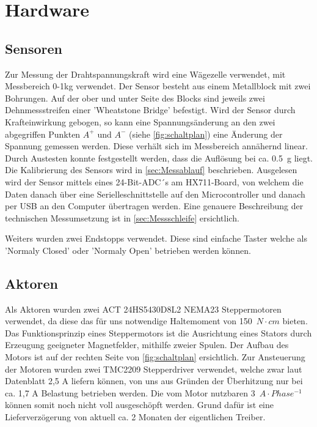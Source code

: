 \section{Hardware}
\label{sec:Hardware}

\subsection{Sensoren}

Zur Messung der Drahtspannungskraft wird eine Wägezelle verwendet, mit Messbereich 0-1kg verwendet. Der Sensor besteht aus einem Metallblock mit zwei Bohrungen. Auf der ober und unter Seite des Blocks sind jeweils zwei Dehnmessstreifen einer 'Wheatstone Bridge' befestigt. Wird der Sensor durch Krafteinwirkung gebogen, so kann eine Spannungsänderung an den zwei abgegriffen Punkten $A^+$ und $A^-$ (siehe \autoref{fig:schaltplan}) eine Änderung der Spannung gemessen werden. Diese verhält sich im Messbereich annähernd linear. Durch Austesten konnte festgestellt werden, dass die Auflösung bei ca. 0.5~g liegt. Die Kalibrierung des Sensors wird in \autoref{sec:Messablauf} beschrieben.\newline
Ausgelesen wird der Sensor mittels eines 24-Bit-ADC´s am HX711-Board, von welchem die Daten danach über eine Serielleschnittstelle auf den Microcontroller und danach per USB an den Computer übertragen werden. Eine genauere Beschreibung der technischen Messumsetzung ist in \autoref{sec:Messschleife} ersichtlich. 


Weiters wurden zwei Endstopps verwendet. Diese sind einfache Taster welche als 'Normaly Closed' oder 'Normaly Open' betrieben werden können.


\subsection{Aktoren}

Als Aktoren wurden zwei ACT 24HS5430D8L2 NEMA23 Steppermotoren verwendet, da diese das für uns notwendige Haltemoment von 150~$N \cdot cm$ bieten. Das Funktionsprinzip eines Steppermotors ist die Ausrichtung eines Stators durch Erzeugung geeigneter Magnetfelder, mithilfe zweier Spulen. Der Aufbau des Motors ist auf der rechten Seite von \autoref{fig:schaltplan} ersichtlich. \newline
Zur Ansteuerung der Motoren wurden zwei TMC2209 Stepperdriver verwendet, welche zwar laut Datenblatt 2,5 A liefern können, von uns aus Gründen der Überhitzung nur bei ca. 1,7 A Belastung betrieben werden. Die vom Motor nutzbaren 3~$A\cdot Phase^{-1}$ können somit noch nicht voll ausgeschöpft werden. Grund dafür ist eine Lieferverzögerung von aktuell ca. 2 Monaten der eigentlichen Treiber. \newline


